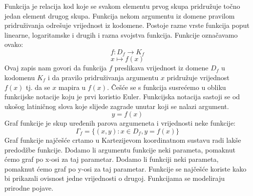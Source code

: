 Funkcija je relacija kod koje se svakom elementu prvog skupa pridružuje točno jedan element drugog skupa.
Funkcija nekom argumentu iz domene pravilom pridruživanja odrešuje vrijednost iz kodomene.
Postoje razne vrste funkcija poput linearne, logaritamske i drugih i razna svojstva funkcija.
Funkcije označavamo ovako:
\[f \colon D_f \to K_f\]
\[x \mapsto f(x)\]
Ovaj zapis nam govori da funkcija \(f\) preslikava vrijednost iz domene \(D_f\) u kodomenu \(K_f\) i da pravilo pridruživanja argumentu \(x\) pridružuje vrijednost \(f(x)\) tj. da se \(x\) mapira u \(f(x)\).
Češće se s funkcija susrećemo u obliku funkcijske notacije koju je prvi koristio Euler.
Funkcijska notacija sastoji se od ukošog latiničnog slova koje slijede zagrade unutar koji se nalazi argument.
\[y = f(x)\]
Graf funkcije je skup uređenih parova argumeneta i vrijednosti neke funkcije:
\[\Gamma_f = \{(x, y) \colon x \in D_f, y = f(x)\}\]
Graf funkcije najčešće crtamo u Kartezijevom koordinatnom sustavu radi lakše predodžbe funkcije.
Dodamo li argumentu funkcije neki parameta, pomaknut ćemo graf po x-osi za taj parametar.
Dodamo li funkciji neki parameta, pomaknut ćemo graf po y-osi za taj parametar.
Funkcije se najčešće koriste kako bi prikazali ovisnost jedne vrijednosti o drugoj.
Funkcijama se modeliraju prirodne pojave.

